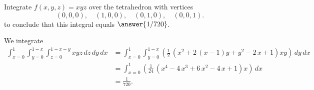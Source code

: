 \documentclass{ximera}
\author{Jim Fowler}
\begin{document}
\begin{exercise}
Integrate $f(x,y,z) = xyz$ over the tetrahedron with vertices
$$
(0,0,0), \hspace{1em}
(1,0,0), \hspace{1em}
(0,1,0), \hspace{1em}
(0,0,1).
$$
to conclude that this integral equals $\answer{1/720}$.

\begin{hint}
We integrate
\begin{align*}
  \int_{x=0}^1   \int_{y=0}^{1-x}  \int_{z=0}^{1-x-y} xyz \, dz \, dy \, dx
&= \int_{x=0}^1   \int_{y=0}^{1-x}  \left( \frac{1}{2} \, {\left(x^{2} + 2 \, {\left(x - 1\right)} y + y^{2} - 2 \, x + 1\right)} x y
 \right) \, dy \, dx \\
&= \int_{x=0}^1  \left( \frac{1}{24} \, {\left(x^{4} - 4 \, x^{3} + 6 \, x^{2} - 4 \, x + 1\right)} x \right) \, dx \\
&= \frac{1}{720}.
\end{align*}
\end{hint}

\end{exercise}
\end{document}

